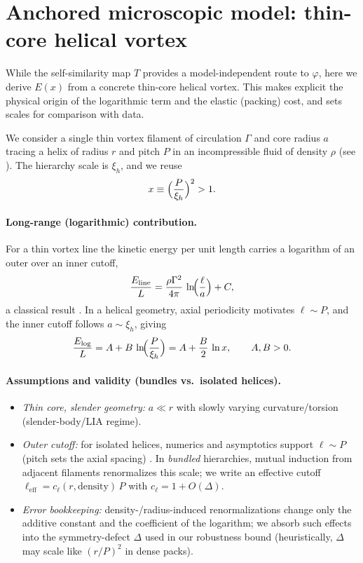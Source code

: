 \documentclass[11pt]{article}
\theoremstyle{remark}
\theoremstyle{definition}
\begin{document}
\section{Anchored microscopic model: thin-core helical vortex}
\label{sec:anchor-model}

While the self-similarity map $T$ provides a model-independent route to $\varphi$, here we derive $E(x)$ from a concrete thin-core helical vortex. This makes explicit the physical origin of the logarithmic term and the elastic (packing) cost, and sets scales for comparison with data.

We consider a single thin vortex filament of circulation $\Gamma$ and core radius $a$ tracing a helix of radius $r$ and pitch $P$ in an incompressible fluid of density $\rho$ (see \cite{Saffman1992,Fetter2009,Widnall1972,Hardin1982,FukumotoOkulov2005}). The hierarchy scale is $\xi_h$, and we reuse
\[
x \equiv \Bigl(\frac{P}{\xi_h}\Bigr)^2>1.
\]

\paragraph{Long-range (logarithmic) contribution.}
For a thin vortex line the kinetic energy per unit length carries a logarithm of an outer over an inner cutoff,
\begin{equation}
\frac{E_{\text{line}}}{L} = \frac{\rho \Gamma^2}{4\pi}\,\ln\!\Bigl(\frac{\ell}{a}\Bigr) + C,
\label{eq:line-energy}
\end{equation}
a classical result \cite{Saffman1992,Fetter2009}. In a helical geometry, axial periodicity motivates $\ell\sim P$, and the inner cutoff follows $a\sim \xi_h$, giving
\begin{equation}
\frac{E_{\log}}{L} = A + B\,\ln\!\Bigl(\frac{P}{\xi_h}\Bigr) = A + \frac{B}{2}\,\ln x,
\qquad A,B>0.
\label{eq:elog}
\end{equation}

\paragraph{Assumptions and validity (bundles vs.\ isolated helices).}
\begin{itemize}
\item \emph{Thin core, slender geometry:} $a\ll r$ with slowly varying curvature/torsion (slender-body/LIA regime).
\item \emph{Outer cutoff:} for isolated helices, numerics and asymptotics support $\ell\sim P$ (pitch sets the axial spacing) \cite{Widnall1972,FukumotoOkulov2005}. In \emph{bundled} hierarchies, mutual induction from adjacent filaments renormalizes this scale; we write an effective cutoff
$\ell_{\mathrm{eff}}=c_\ell(r,\text{density})\,P$ with $c_\ell=1+O(\Delta)$.
\item \emph{Error bookkeeping:} density-/radius-induced renormalizations change only the additive constant and the coefficient of the logarithm; we absorb such effects into the symmetry-defect $\Delta$ used in our robustness bound (heuristically, $\Delta$ may scale like $(r/P)^2$ in dense packs).
\end{itemize}
\end{document}
